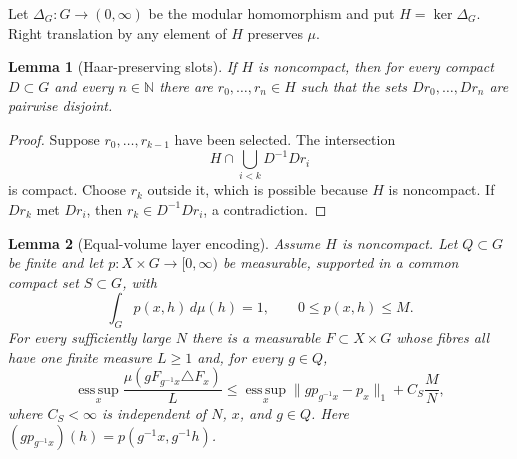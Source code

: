 \documentclass[11pt]{article}
\newtheorem{lemma}{Lemma}
\newcommand{\1}{\mathbf 1}
\newcommand{\esssup}{\operatorname*{ess\,sup}}
\begin{document}
Let $\Delta_G:G\to(0,\infty)$ be the modular homomorphism and put
$H=\ker\Delta_G$.  Right translation by any element of $H$ preserves $\mu$.

\begin{lemma}[Haar-preserving slots]\label{lem:slots}
If $H$ is noncompact, then for every compact $D\subset G$ and every
$n\in\mathbb N$ there are $r_0,\ldots,r_n\in H$ such that the sets
$Dr_0,\ldots,Dr_n$ are pairwise disjoint.
\end{lemma}

\begin{proof}
Suppose $r_0,\ldots,r_{k-1}$ have been selected.  The intersection
\[
 H\cap\bigcup_{i<k}D^{-1}Dr_i
\]
is compact.  Choose $r_k$ outside it, which is possible because $H$ is
noncompact.  If $Dr_k$ met $Dr_i$, then
$r_k\in D^{-1}Dr_i$, a contradiction.
\end{proof}

\begin{lemma}[Equal-volume layer encoding]\label{lem:encoding}
Assume $H$ is noncompact.  Let $Q\subset G$ be finite and let
$p:X\times G\to[0,\infty)$ be measurable, supported in a common compact set
$S\subset G$, with
\[
 \int_Gp(x,h)\,d\mu(h)=1,\qquad 0\leq p(x,h)\leq M.
\]
For every sufficiently large $N$ there is a measurable
$F\subset X\times G$ whose fibres all have one finite measure $L\geq1$ and,
for every $g\in Q$,
\begin{equation}\label{eq:encoding-bound}
 \esssup_x\frac{\mu(gF_{g^{-1}x}\triangle F_x)}{L}
 \leq \esssup_x\|g p_{g^{-1}x}-p_x\|_1+C_{S}\frac{M}{N},
\end{equation}
where $C_S<\infty$ is independent of $N$, $x$, and $g\in Q$.
Here $(g p_{g^{-1}x})(h)=p(g^{-1}x,g^{-1}h)$.
\end{lemma}
\end{document}
